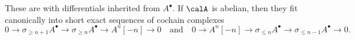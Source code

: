 \begin{definition}
\begin{enumerate}
    These are  with differentials inherited from $A^\bullet$. 
    If $\calA$ is abelian, then they fit canonically into short exact sequences of cochain complexes
    $$
    0 \longrightarrow \sigma_{\ge n+1} A^\bullet \longrightarrow \sigma_{\ge n} A^\bullet \longrightarrow A^n[-n] \longrightarrow 0
    \quad\text{and}\quad
    0 \longrightarrow A^n[-n] \longrightarrow \sigma_{\le n} A^\bullet \longrightarrow \sigma_{\le n-1} A^\bullet \longrightarrow 0.
    $$

\end{enumerate}
\end{definition}